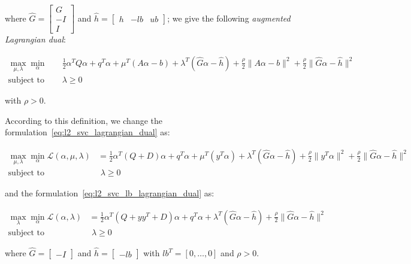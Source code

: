 where $\hat{G} =
\begin{bmatrix}
 G \\
-I \\
 I 
\end{bmatrix}$ and $\hat{h} =
\begin{bmatrix}
h & -lb & ub
\end{bmatrix}$; we give the following \emph{augmented Lagrangian dual}:

\begin{equation} \label{eq:l2_svc_gen_aug_lagrangian_dual}
	\begin{aligned}
		    \max_{\mu,\lambda} \min_{\alpha} \quad & \frac{1}{2} \alpha^T Q \alpha + q^T \alpha + \mu^T (A \alpha - b) + \lambda^T (\hat{G} \alpha - \hat{h}) + \frac{\rho}{2} \| A \alpha - b \|^2 + \frac{\rho}{2} \| \hat{G} \alpha - \hat{h} \|^2 \\
    \text{subject to} \quad & \lambda \geq 0
	\end{aligned}
\end{equation}

with $\rho > 0$.

\bigskip

According to this definition, we change the formulation~\ref{eq:l2_svc_lagrangian_dual} as:

\begin{equation} \label{eq:l2_svc_aug_lagrangian_dual}
	\begin{aligned}
		    \max_{\mu,\lambda} \min_{\alpha} \mathcal{L}(\alpha,\mu,\lambda) &= \frac{1}{2} \alpha^T (Q + D) \alpha+q^T\alpha + \mu^T (y^T \alpha) + \lambda^T (\hat{G} \alpha - \hat{h}) + \frac{\rho}{2} \| y^T \alpha \|^2 + \frac{\rho}{2} \| \hat{G} \alpha - \hat{h} \|^2 \\
    \text{subject to} \quad & \,\, \lambda \geq 0
	\end{aligned}
\end{equation}

and the formulation~\ref{eq:l2_svc_lb_lagrangian_dual} as:

\begin{equation} \label{eq:l2_svc_lb_aug_lagrangian_dual}
	\begin{aligned}
    	\max_{\lambda} \min_{\alpha} \mathcal{L}(\alpha,\lambda) &= \frac{1}{2} \alpha^T (Q + yy^T + D) \alpha + q^T \alpha + \lambda^T (\hat{G} \alpha - \hat{h}) + \frac{\rho}{2} \| \hat{G} \alpha - \hat{h} \|^2 \\
    \text{subject to} \quad & \,\, \lambda \geq 0
	\end{aligned}
\end{equation}

where $\hat{G} =
\begin{bmatrix}
-I
\end{bmatrix}$ and $\hat{h} =
\begin{bmatrix}
-lb
\end{bmatrix}$ with $lb^T = [0, \dots, 0]$ and $\rho > 0$.